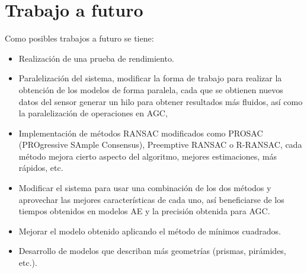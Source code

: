 

\section{Trabajo a futuro}

Como posibles trabajos a futuro se tiene:


\begin{itemize}
	\item Realización de una prueba de rendimiento.
	\item Paralelización del sistema, modificar la forma de trabajo para realizar la obtención de los modelos de forma paralela, cada que se obtienen nuevos datos del sensor generar un hilo para obtener resultados más fluidos, así como la paralelización de operaciones en AGC,
	\item Implementación de métodos RANSAC modificados como PROSAC (PROgressive SAmple Consensus), Preemptive RANSAC o R-RANSAC, cada método mejora cierto aspecto del algoritmo, mejores estimaciones, más rápidos, etc. 
	\item Modificar el sistema para usar una combinación de los dos métodos y aprovechar las mejores características de cada uno, así beneficiarse de los tiempos obtenidos en modelos AE y la precisión obtenida para AGC.
	\item Mejorar el modelo obtenido aplicando el método de mínimos cuadrados.
	\item Desarrollo de modelos que describan más geometrías (prismas, pirámides, etc.).
	
\end{itemize}

